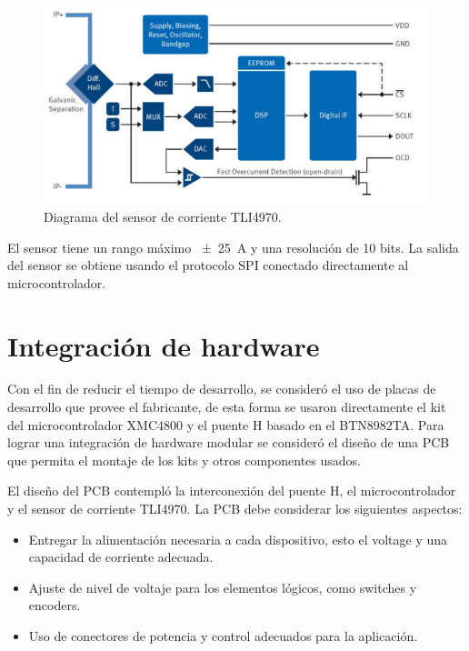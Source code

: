 \begin{figure}[H]
  \centering
  \includegraphics[scale=.45]{img/cap3/tli4970}
  \caption{Diagrama del sensor de corriente TLI4970.}
  \label{cap3_tli4970}
\end{figure}

El sensor tiene un rango máximo \SI{\pm 25}{\ampere} y una resolución de 10 bits. La salida del sensor se obtiene usando el protocolo SPI conectado directamente al microcontrolador.

\section{Integración de hardware}

Con el fin de reducir el tiempo de desarrollo, se consideró el uso de placas de desarrollo que provee el fabricante, de esta forma se usaron directamente el kit del microcontrolador XMC4800 y el puente H basado en el BTN8982TA. Para lograr una integración de hardware modular se consideró  el diseño de una PCB que permita el montaje de los kits y otros componentes usados.

El diseño del PCB contempló la interconexión del puente H, el microcontrolador y el sensor de corriente TLI4970. La PCB debe considerar los siguientes aspectos:
\begin{itemize}
\item Entregar la alimentación necesaria a cada dispositivo, esto el voltage y una capacidad de corriente adecuada.
\item Ajuste de nivel de voltaje para los elementos lógicos, como switches y encoders.
\item Uso de conectores de potencia y control adecuados para la aplicación.
\end{itemize}



